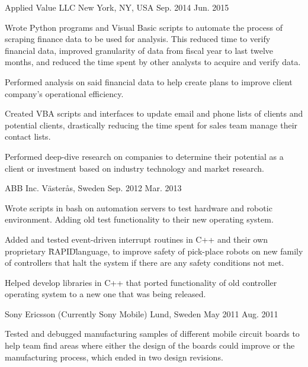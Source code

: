 \begin{cventries}
        {Applied Value LLC}
        {New York, NY, USA}
        {Sep. 2014 \- Jun. 2015}
        {\begin{cvitems}
            \item{Wrote Python programs and Visual Basic scripts to automate the process of scraping finance data to be used for analysis. This reduced time to verify financial data, improved granularity of data from fiscal year to last twelve months, and reduced the time spent by other analysts to acquire and verify data.}
            \item{Performed analysis on said financial data to help create plans to improve client company's operational efficiency.}
            \item{Created VBA scripts and interfaces to update email and phone lists of clients and potential clients, drastically reducing the time spent for sales team manage their contact lists.}
            \item{Performed deep-dive research on companies to determine their potential as a client or investment based on industry technology and market research.}
            \end{cvitems}
        }
        {ABB Inc.}
        {Västerås, Sweden}
        {Sep. 2012 \- Mar. 2013}
        {\begin{cvitems}
            \item{Wrote scripts in bash on automation servers to test hardware and robotic environment. Adding old test functionality to their new operating system.}
            \item{Added and tested event-driven interrupt routines in C++ and their own proprietary \"RAPID\" language, to improve safety of pick-place robots on new family of controllers that halt the system if there are any safety conditions not met.}
            \item{Helped develop libraries in C++ that ported functionality of old controller operating system to a new one that was being released.}
            \end{cvitems}
        }
        {Sony Ericsson (Currently Sony Mobile)}
        {Lund, Sweden}
        {May 2011 \- Aug. 2011}
        {\begin{cvitems}
            \item{Tested and debugged manufacturing samples of different mobile circuit boards to help team find areas where either the design of the boards could improve or the manufacturing process, which ended in two design revisions.}

\end{cvitems}}
\end{cventries}
